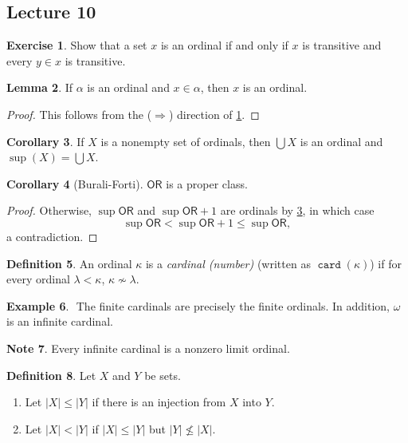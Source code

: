 \documentclass[10pt,letterpaper,cm]{nupset}
\theoremstyle{definition}
\newtheorem{definition}{Definition}[subsection]
\newtheorem{exmp}[definition]{Example}
\newtheorem{note}[definition]{Note}
\theoremstyle{theorem}
\newtheorem{lemma}[definition]{Lemma}
\newtheorem{corollary}[definition]{Corollary}
\newtheorem{exercise}[definition]{Exercise}
\theoremstyle{remark}
\newcommand{\1}{\mathbf{1}}
\newcommand{\0}{\vec 0}
\newcommand{\ord}{\mathsf{OR}}
\DeclareMathOperator{\card}{\mathtt{card}}
\begin{document}
\subsection{Lecture 10}


\begin{exercise}\label{ord-char}
Show that a set $x$ is an ordinal if and only if $x$ is transitive and every $y\in x$ is transitive. 
\end{exercise}

\begin{lemma}
If $\alpha$ is an ordinal and $x\in \alpha$, then $x$ is an ordinal. 
\end{lemma}
\begin{proof}
This follows from the ($\Longrightarrow$) direction of \cref{ord-char}.
\end{proof}

\begin{corollary}\label{LC}
If $X$ is a nonempty set of ordinals, then $\bigcup{X}$ is an ordinal and $\sup(X) = \bigcup{X}$.
\end{corollary}

\begin{corollary}[Burali-Forti]\label{B-F}
$\ord$ is a proper class.
\end{corollary}
\begin{proof}
Otherwise, $\sup{\ord}$ and $\sup{\ord}+1$ are ordinals by \cref{LC}, in which case $$\sup{\ord} < \sup{\ord} +1 \leq \sup{\ord},$$ a contradiction. 
 \end{proof}

\begin{definition}
 An ordinal $\kappa$ is a \textit{cardinal (number)} (written as $\card(\kappa)$) if for every ordinal $\lambda < \kappa$, $\kappa \not \sim \lambda$.
\end{definition}

\begin{exmp} $ $
The finite cardinals are precisely the finite ordinals. In addition, $\omega$ is an infinite cardinal.
\end{exmp}

\begin{note}
Every infinite cardinal is a nonzero limit ordinal. 
\end{note}

\begin{definition}
Let $X$ and $Y$ be sets. 
\begin{enumerate}
\item Let $\left\lvert{X}\right\rvert \leq \left\lvert{Y}\right\rvert$ if there is an injection from $X$ into $Y$. 
\item Let $\left\lvert{X}\right\rvert<\left\lvert{Y}\right\rvert$ if $\left\lvert{X}\right\rvert \leq \left\lvert{Y}\right\rvert$ but $\left\lvert{Y}\right\rvert \not \leq \left\lvert{X}\right\rvert$.
\end{enumerate}
\end{definition}
\end{document}
